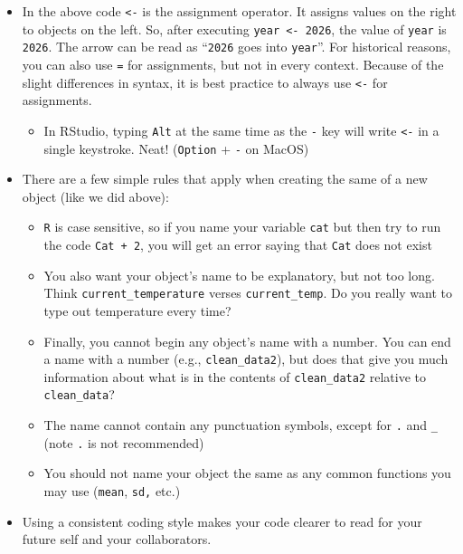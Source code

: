 \documentclass[
  10pt,
  letterpaper,
  twoside,
  openright]{book}
\providecommand{\tightlist}{%
  \setlength{\itemsep}{0pt}\setlength{\parskip}{0pt}}
\begin{document}
\begin{itemize}
\item
  In the above code \texttt{\textless{}-} is the assignment operator. It
  assigns values on the right to objects on the left. So, after
  executing \texttt{year\ \textless{}-\ 2026}, the value of
  \texttt{year} is \texttt{2026}. The arrow can be read as
  ``\texttt{2026} goes into \texttt{year}''. For historical reasons, you
  can also use \texttt{=} for assignments, but not in every context.
  Because of the slight differences in syntax, it is best practice to
  always use \texttt{\textless{}-} for assignments.

  \begin{itemize}
  \tightlist
  \item
    In RStudio, typing \texttt{Alt} at the same time as the \texttt{-}
    key will write \texttt{\textless{}-} in a single keystroke. Neat!
    (\texttt{Option} + \texttt{-} on MacOS)
  \end{itemize}
\item
  There are a few simple rules that apply when creating the same of a
  new object (like we did above):

  \begin{itemize}
  \tightlist
  \item
    \texttt{R} is case sensitive, so if you name your variable
    \texttt{cat} but then try to run the code \texttt{Cat\ +\ 2}, you
    will get an error saying that \texttt{Cat} does not exist\\
  \item
    You also want your object's name to be explanatory, but not too
    long. Think \texttt{current\_temperature} verses
    \texttt{current\_temp}. Do you really want to type out temperature
    every time?\\
  \item
    Finally, you cannot begin any object's name with a number. You can
    end a name with a number (e.g., \texttt{clean\_data2}), but does
    that give you much information about what is in the contents of
    \texttt{clean\_data2} relative to \texttt{clean\_data}?\\
  \item
    The name cannot contain any punctuation symbols, except for
    \texttt{.} and \texttt{\_} (note \texttt{.} is not recommended)\\
  \item
    You should not name your object the same as any common functions you
    may use (\texttt{mean}, \texttt{sd,} etc.)
  \end{itemize}
\item
  Using a consistent coding style makes your code clearer to read for
  your future self and your collaborators.
\end{itemize}
\end{document}
